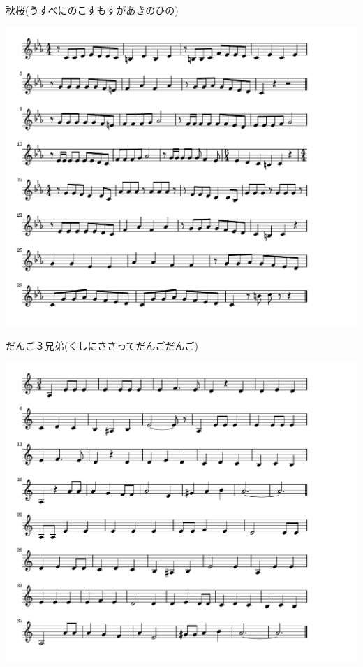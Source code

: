 \documentclass[a4paper]{ltjsarticle}
\begin{document}
\vspace{-10mm} \hspace{10mm}
秋桜(うすべにのこすもすがあきのひの)

\includegraphics[clip]{dango3kyodai_crop.pdf}

\vspace{-10mm} \hspace{10mm}
だんご３兄弟(くしにささってだんごだんご)

\includegraphics[clip]{chimchimcheree_crop.pdf}
\end{document}
